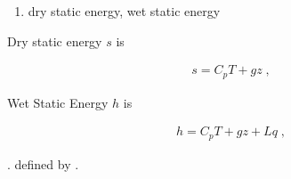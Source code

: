 \begin{enumerate}
\def\labelenumi{\arabic{enumi}.}
\setcounter{enumi}{5}
\tightlist
\item
  dry static energy, wet static energy
\end{enumerate}

Dry static energy \(s\) is

\begin{eqnarray}
  s = C_p T + g z \; ,
\end{eqnarray}

Wet Static Energy \(h\) is

\begin{eqnarray}
  h = C_p T + g z + L q \; ,
\end{eqnarray}

. defined by .
